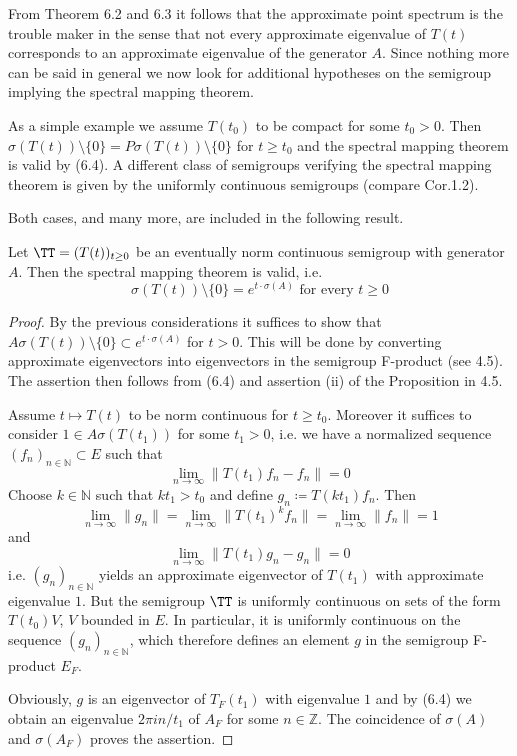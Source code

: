From Theorem 6.2 and 6.3 it follows that the approximate point spectrum is the trouble maker in the sense that not every approximate eigenvalue of $T(t)$ corresponds to an approximate eigenvalue of the generator $A$.
Since nothing more can be said in general we now look for additional hypotheses on the semigroup implying the spectral mapping theorem.

As a simple example we assume $T(t_{0})$ to be compact for some $t_{0} > 0$.
Then $\sigma(T(t)) \setminus \{0\} = P\sigma(T(t)) \setminus \{0\}$ for $t \geq t_{0}$ and the spectral mapping theorem is valid by (6.4).
A different class of semigroups verifying the spectral mapping theorem is given by the uniformly continuous semigroups (compare Cor.1.2).

Both cases, and many more, are included in the following result.


\newpage
\begin{theorem}\label{thm:a3-6.6}
	Let $\TT = (T(t))_{t\geq 0}$ be an eventually norm continuous semigroup with generator $A$.
	Then the spectral mapping theorem is valid, i.e.
	\[
	\sigma(T(t)) \setminus \{0\} = e^{t \cdot \sigma(A)} \text{ for every } t \geq 0
	\]
\end{theorem}

\begin{proof}
	By the previous considerations it suffices to show that $A\sigma(T(t)) \setminus \{0\} \subset e^{t \cdot \sigma(A)}$ for $t > 0$.
	This will be done by converting approximate eigenvectors into eigenvectors in the semigroup F-product (see 4.5).
	The assertion then follows from (6.4) and assertion (ii) of the Proposition in 4.5.
	
	Assume $t \mapsto T(t)$ to be norm continuous for $t \geq t_{0}$.
	Moreover it suffices to consider $1 \in A\sigma(T(t_{1}))$ for some $t_{1} > 0$, i.e. we have a normalized sequence $(f_{n})_{n\in\mathbb{N}} \subset E$ such that
	\[
	\lim_{n\to\infty} \|T(t_{1})f_{n} - f_{n}\| = 0
	\]
	Choose $k \in \mathbb{N}$ such that $kt_{1} > t_{0}$ and define $g_{n} \coloneqq T(kt_{1})f_{n}$.
	Then
	\[
	\lim_{n\to\infty}\|g_{n}\| = \lim_{n\to\infty}\|T(t_{1})^{k}f_{n}\| = \lim_{n\to\infty}\|f_{n}\| = 1
	\]
	and
	\[
	\lim_{n\to\infty} \|T(t_{1})g_{n} - g_{n}\| = 0
	\]
	i.e. $(g_{n})_{n\in\mathbb{N}}$ yields an approximate eigenvector of $T(t_{1})$ with approximate eigenvalue $1$.
	But the semigroup $\TT$ is uniformly continuous on sets of the form $T(t_{0})V$, $V$ bounded in $E$.
	In particular, it is uniformly continuous on the sequence $(g_{n})_{n\in\mathbb{N}}$, which therefore defines an element $g$ in the semigroup F-product $E_{F}$.
	
	Obviously, $g$ is an eigenvector of $T_{F}(t_{1})$ with eigenvalue $1$ and by (6.4) we obtain an eigenvalue $2\pi i n/t_{1}$ of $A_{F}$ for some $n \in \mathbb{Z}$.
	The coincidence of $\sigma(A)$ and $\sigma(A_{F})$ proves the assertion.
\end{proof}

